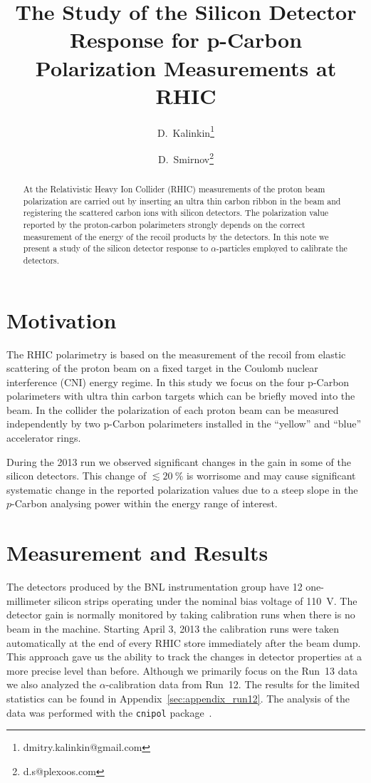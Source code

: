\documentclass[a4paper,12pt]{article}
\title{The Study of the Silicon Detector Response for p-Carbon Polarization Measurements at RHIC}
\author[1]{D.~Kalinkin\thanks{dmitry.kalinkin@gmail.com}}
\author[2]{D.~Smirnov\thanks{d.s@plexoos.com}}
\affil[1]{Institute for Theoretical and Experimental Physics}
\affil[2]{Brookhaven National Laboratory}
\begin{document}
\maketitle

\begin{abstract}

At the Relativistic Heavy Ion Collider (RHIC) measurements of the proton beam
polarization are carried out by inserting an ultra thin carbon ribbon in the
beam and registering the scattered carbon ions with silicon detectors. The
polarization value reported by the proton-carbon polarimeters strongly depends
on the correct measurement of the energy of the recoil products by the
detectors. In this note we present a study of the silicon detector response to
$\alpha$-particles employed to calibrate the detectors.

\end{abstract}


\section{Motivation}

The RHIC polarimetry is based on the measurement of the recoil from elastic
scattering of the proton beam on a fixed target in the Coulomb nuclear
interference (CNI) energy regime. In this study we focus on the four p-Carbon
polarimeters with ultra thin carbon targets which can be briefly moved into the
beam. In the collider the polarization of each proton beam can be measured
independently by two p-Carbon polarimeters installed in the ``yellow'' and
``blue'' accelerator rings.

During the 2013 run we observed significant changes in the gain in some of the
silicon detectors. This change of $\lesssim 20~\%$ is worrisome and may cause
significant systematic change in the reported polarization values due to a steep
slope in the $p$-Carbon analysing power within the energy range of interest.


\section{Measurement and Results}

The detectors produced by the BNL instrumentation group have 12 one-millimeter
silicon strips operating under the nominal bias voltage of 110~V. The detector
gain is normally monitored by taking calibration runs when there is no beam in
the machine. Starting April 3, 2013 the calibration runs were taken
automatically at the end of every RHIC store immediately after the beam dump.
This approach gave us the ability to track the changes in detector properties at
a more precise level than before. Although we primarily focus on the Run~13 data
we also analyzed the $\alpha$-calibration data from Run~12. The results for the
limited statistics can be found in Appendix~\ref{sec:appendix_run12}. The
analysis of the data was performed with the {\tt cnipol}
package~\cite{cnipol_code}.
\end{document}
